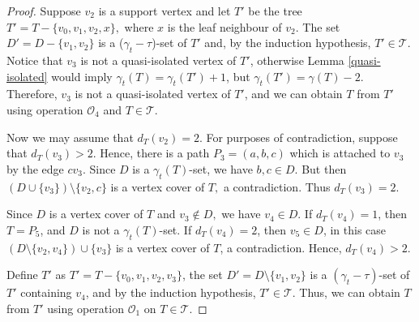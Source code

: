 \documentclass[12pt]{article}%
\theoremstyle{definition}
\newcommand{\gtt}{$(\gamma_t - \tau)$}
\begin{document}
\begin{proof}

Suppose $v_2$ is a support vertex and let $T'$ be the
tree $T' = T-\{v_0, v_1, v_2,x\},$ where $x$ is the leaf
neighbour of $v_2.$   The set $D'=D-\{v_1,v_2\}$ is a
($\gamma_t - \tau$)-set of $T'$ and, by the induction
hypothesis, $T'\in \mathcal{T}$. Notice that $v_3$ is
not a quasi-isolated vertex of $T'$, otherwise Lemma
\ref{quasi-isolated} would imply $\gamma_t (T) = \gamma_t
(T')+1$, but $\gamma_t (T') = \gamma (T) - 2$. Therefore,
$v_3$ is not a quasi-isolated vertex of $T'$, and we can
obtain $T$ from $T'$ using  operation $\mathcal{O}_4$
and $T\in \mathcal{T}$.



Now we may assume that $d_T (v_2) = 2$.   For purposes
of contradiction, suppose that $d_T(v_3)>2$.   Hence, there
is a path $P_3=(a,b,c)$ which is attached to $v_3$ by the
edge $cv_3$. Since $D$ is a $\gamma_t (T)$-set, we have
$b,c \in D$.     But then $(D \cup \{ v_3 \})  \setminus \{ v_2,
c \}$ is a vertex cover of $T,$ a contradiction. Thus $d_T
(v_3)=2$.


Since $D$ is a vertex cover of $T$ and $v_3 \notin D,$ we
have $v_4\in D$.  If $d_T(v_4)=1$, then $T=P_5$, and $D$
is not a $\gamma _t (T)$-set. If $d_T (v_4) = 2$, then $v_5
\in D$, in this case $(D \setminus \{ v_2, v_4 \}) \cup \{ v_3 \}$
is a vertex cover of $T$, a contradiction.  Hence, $d_T (v_4)
> 2.$ 


Define $T'$ as $T' = T - \{ v_0, v_1, v_2, v_3 \}$, the set 
$D'=D \setminus \{ v_1, v_2 \}$ is a \gtt-set of $T'$
containing $v_4$, and by the induction hypothesis,
$T'\in \mathcal{T}$.   Thus, we can obtain $T$ from
$T'$ using  operation $\mathcal{O}_1$ on $T \in
\mathcal{T}$. 

\end{proof}
\end{document}
